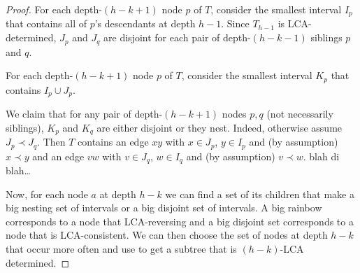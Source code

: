 \documentclass[kpfonts]{patmorin}
\begin{document}
\begin{proof}
  For each depth-$(h-k+1)$ node $p$ of $T$, consider the smallest interval $I_p$ that contains all of $p$'s descendants at depth $h-1$.  Since $T_{h-1}$ is LCA-determined, $J_p$ and $J_q$ are disjoint for each pair of depth-$(h-k-1)$ siblings $p$ and $q$.
  
  For each depth-$(h-k+1)$ node $p$ of $T$, consider the smallest interval $K_p$ that contains $I_p\cup J_p$.

  We claim that for any pair of depth-$(h-k+1)$ nodes $p,q$ (not necessarily siblings), $K_p$ and $K_q$ are either disjoint or they nest.  Indeed, otherwise assume $J_p\prec J_q$.  Then $T$ contains an edge $xy$ with $x\in J_p$, $y\in I_p$ and (by assumption) $x\prec y$ and an edge $vw$ with $v\in J_q$, $w\in I_q$ and (by assumption) $v\prec w$. blah di blah\ldots
  
  
  Now, for each node $a$ at depth $h-k$ we can find a set of its children that make a big nesting set of intervals or a big disjoint set of intervals.  A big rainbow corresponds to a node that LCA-reversing and a big disjoint set corresponds to a node that is LCA-consistent. We can then choose the set of nodes at depth $h-k$ that occur more often and use  to get a subtree that is $(h-k)$-LCA determined.
  

\end{proof}
\end{document}
